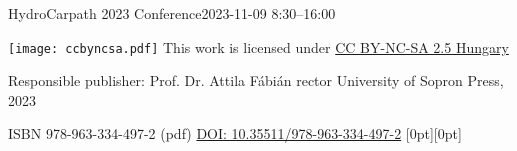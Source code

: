 \vspace*{\fill}

\footnotesize{}
\noindent{}HydroCarpath 2023 Conference\newline{}2023-11-09 8:30–16:00
\vspace*{5mm}

\noindent{}\texttt{[image: ccbyncsa.pdf]}\newline{}
This work is licensed under \href{https://creativecommons.org/licenses/by-nc-sa/2.5/hu/deed.en}{CC BY-NC-SA 2.5 Hungary}

\noindent{}Responsible publisher: Prof. Dr. Attila Fábián rector \newline{} University of Sopron Press, 2023

\noindent ISBN 978-963-334-497-2 (pdf)\newline{}
\noindent \href{https://doi.org/10.35511/978-963-334-497-2}{DOI: 10.35511/978-963-334-497-2}
\hspace*{\fill} \hspace{1mm} \raisebox{0mm}[0pt][0pt]{}
\normalsize{}

\setcounter{page}{2}
\cleardoublepage{}
\fancyhead[LE,RO]{\thepage}

\setcounter{secnumdepth}{0}%
{}
\tableofcontents{}
\newpage{}
{}

\setcounter{articleid}{0}
{}


{}
\printindex


